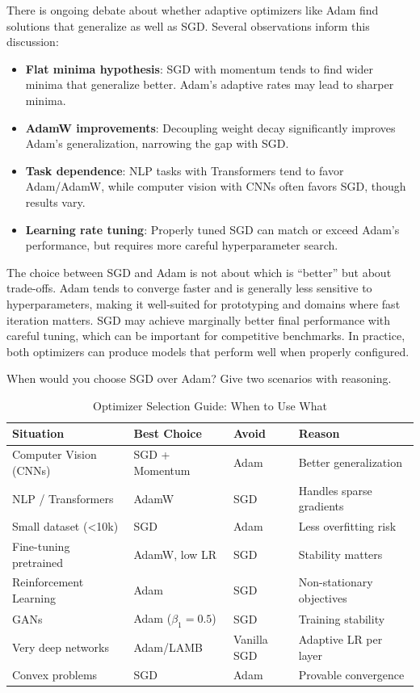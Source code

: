 \documentclass[../../main.tex]{subfiles}
\begin{document}
There is ongoing debate about whether adaptive optimizers like Adam find solutions that generalize as well as SGD. Several observations inform this discussion:

\begin{itemize}
    \item \textbf{Flat minima hypothesis}: SGD with momentum tends to find wider minima that generalize better. Adam's adaptive rates may lead to sharper minima.
    \item \textbf{AdamW improvements}: Decoupling weight decay significantly improves Adam's generalization, narrowing the gap with SGD.
    \item \textbf{Task dependence}: NLP tasks with Transformers tend to favor Adam/AdamW, while computer vision with CNNs often favors SGD, though results vary.
    \item \textbf{Learning rate tuning}: Properly tuned SGD can match or exceed Adam's performance, but requires more careful hyperparameter search.
\end{itemize}

\begin{perspective}
The choice between SGD and Adam is not about which is ``better'' but about trade-offs. Adam tends to converge faster and is generally less sensitive to hyperparameters, making it well-suited for prototyping and domains where fast iteration matters. SGD may achieve marginally better final performance with careful tuning, which can be important for competitive benchmarks. In practice, both optimizers can produce models that perform well when properly configured.
\end{perspective}

\begin{checkpoint}
When would you choose SGD over Adam? Give two scenarios with reasoning.
\end{checkpoint}

\begin{table}[htbp]
\centering
\caption{Optimizer Selection Guide: When to Use What}
\label{tab:optimizer-selection-guide}
\begin{tabular}{@{}llll@{}}
\toprule
\textbf{Situation} & \textbf{Best Choice} & \textbf{Avoid} & \textbf{Reason} \\
\midrule
Computer Vision (CNNs) & SGD + Momentum & Adam & Better generalization \\
NLP / Transformers & AdamW & SGD & Handles sparse gradients \\
Small dataset (<10k) & SGD & Adam & Less overfitting risk \\
Fine-tuning pretrained & AdamW, low LR & SGD & Stability matters \\
Reinforcement Learning & Adam & SGD & Non-stationary objectives \\
GANs & Adam ($\beta_1=0.5$) & SGD & Training stability \\
Very deep networks & Adam/LAMB & Vanilla SGD & Adaptive LR per layer \\
Convex problems & SGD & Adam & Provable convergence \\
\bottomrule
\end{tabular}
\end{table}
\end{document}
